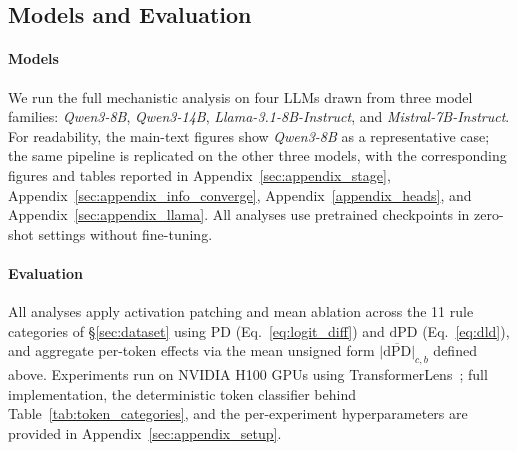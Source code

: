 \documentclass[11pt]{article}
\begin{document}

\subsection{Models and Evaluation}
\label{sec:models_eval}

\paragraph{Models}
We run the full mechanistic analysis on four LLMs drawn from three model families: \textit{Qwen3-8B}, \textit{Qwen3-14B}, \textit{Llama-3.1-8B-Instruct}, and \textit{Mistral-7B-Instruct}. For readability, the main-text figures show \textit{Qwen3-8B} as a representative case; the same pipeline is replicated on the other three models, with the corresponding figures and tables reported in Appendix~\ref{sec:appendix_stage}, Appendix~\ref{sec:appendix_info_converge}, Appendix~\ref{appendix_heads}, and Appendix~\ref{sec:appendix_llama}. All analyses use pretrained checkpoints in zero-shot settings without fine-tuning.

\paragraph{Evaluation}
All analyses apply activation patching and mean ablation across the 11 rule categories of \S\ref{sec:dataset} using $\text{PD}$ (Eq.~\ref{eq:logit_diff}) and $\text{dPD}$ (Eq.~\ref{eq:dld}), and aggregate per-token effects via the mean unsigned form $\overline{|\mathrm{dPD}|}_{c,b}$ defined above. Experiments run on NVIDIA H100 GPUs using TransformerLens~\citep{nanda2022transformerlens}; full implementation, the deterministic token classifier behind Table~\ref{tab:token_categories}, and the per-experiment hyperparameters are provided in Appendix~\ref{sec:appendix_setup}.
\end{document}
